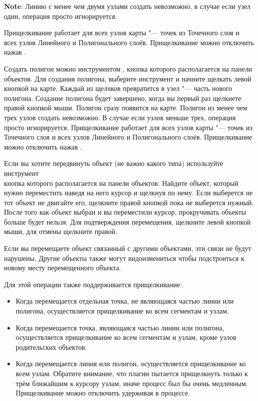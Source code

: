 \textbf{Note}: Линию с менее чем двумя узлами создать невозможно, в
случае если узел один, операция просто игнорируется.

Прищелкивание работает для всех узлов карты "--- точек из Точечного слоя
и всех узлов Линейного и Полигонального слоёв. Прищелкивание можно
отключить нажав .


Создать полигон можно инструментом ,
кнопка которого располагается на панели объектов. Для создания полигона,
выберите инструмент и начните щелкать левой кнопкой на карте. Каждый из
щелчков превратится в узел "--- часть нового полигона. Создание полигона
будет завершено, когда вы первый раз щелкнете правой кнопкой мыши.
Полигон сразу появится на карте. Полигон из менее чем трех узлов создать
невозможно. В случае если узлов меньше трех, операция просто
игнорируется. Прищелкивание работает для всех узлов карты "--- точек из
Точечного слоя и всех узлов Линейного и Полигонального слоёв.
Прищелкивание можно отключить нажав .


Если вы хотите передвинуть объект (не важно какого типа) используйте
инструмент \\
 кнопка которого
располагается на панели объектов. Найдите объект, который нужно
переместить наведя на него курсор и щелкнув по нему. Если выберется не
тот объект не двигайте его, щелкните правой кнопкой пока не выберется
нужный. После того как объект выбран и вы переместили курсор,
прокручивать объекты больше будет нельзя. Для подтверждения перемещения,
щелкните левой кнопкой мыши, для отмены щелкните правой.

Если вы перемещаете объект связанный с другими объектами, эти связи не
будут нарушены. Другие объекты также могут видоизмениться чтобы
подстроиться к новому месту перемещенного объекта.

Для этой операции также поддерживается прищелкивание:

\begin{itemize}[label=--]
\item Когда перемещается отдельная точка, не являющаяся частью линии или
полигона, осуществляется прищелкивание ко всем сегментам и узлам.
\item Когда перемещается точка, являющаяся частью линии или полигона,
осуществляется прищелкивание ко всем сегментам и узлам, кроме узлов
родительских объектов.
\item Когда перемещается линия или полигон, осуществляется прищелкивание
ко всем узлам. Обратите внимание, что плагин пытается прищелкнуть только
к трём ближайшим к курсору узлам, иначе процесс был бы очень медленным.
Прищелкивание можно отключить удерживая  в процессе.
\end{itemize}

